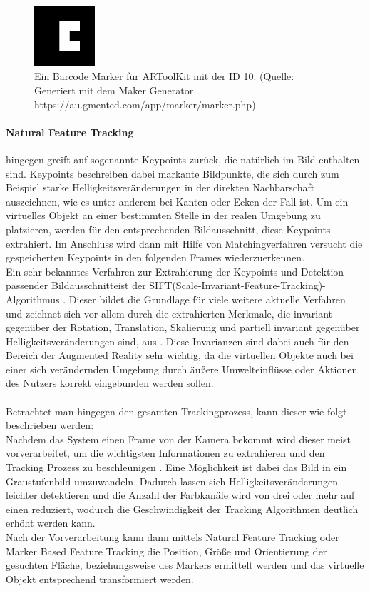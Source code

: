 \begin{figure}[h!]
\centering
\includegraphics[width=0.2\textwidth]{Abbildungen/BarcodeMarker3x3-10.png}
\caption[Barcode Marker]{Ein Barcode Marker für ARToolKit mit der ID 10. (Quelle: Generiert mit dem  Maker Generator https://au.gmented.com/app/marker/marker.php)}
\label{fig:barcode-marker}
\end{figure}


\paragraph{Natural Feature Tracking} hingegen greift auf sogenannte Keypoints zurück, die natürlich im Bild enthalten sind. Keypoints beschreiben dabei markante Bildpunkte, die sich durch zum Beispiel starke Helligkeitsveränderungen in der direkten Nachbarschaft auszeichnen, wie es unter anderem bei Kanten oder Ecken der Fall ist. Um ein virtuelles Objekt an einer bestimmten Stelle in der realen Umgebung zu platzieren, werden für den entsprechenden Bildausschnitt, diese Keypoints extrahiert. Im Anschluss wird dann mit Hilfe von Matchingverfahren versucht die gespeicherten Keypoints in den folgenden Frames wiederzuerkennen. \\
Ein sehr bekanntes Verfahren zur Extrahierung der Keypoints und Detektion passender Bildausschnitteist der SIFT(Scale-Invariant-Feature-Tracking)-Algorithmus . Dieser bildet die Grundlage für viele weitere aktuelle Verfahren und zeichnet sich vor allem durch die extrahierten Merkmale, die invariant gegenüber der Rotation, Translation, Skalierung und partiell invariant gegenüber Helligkeitsveränderungen sind, aus \citep[S. 345]{nischwitz:bildverarbeitung}. Diese Invarianzen sind dabei auch für den Bereich der Augmented Reality sehr wichtig, da die virtuellen Objekte auch bei einer sich verändernden Umgebung durch äußere Umwelteinflüsse oder Aktionen des Nutzers korrekt eingebunden werden sollen.\\
\\
Betrachtet man hingegen den gesamten Trackingprozess, kann dieser wie folgt beschrieben werden:\\
Nachdem das System einen Frame von der Kamera bekommt wird dieser meist vorverarbeitet, um die wichtigsten Informationen zu extrahieren und den Tracking Prozess zu beschleunigen \citep[S. 5]{cukovic:marker-vs-natural}. Eine Möglichkeit ist dabei das Bild in ein Graustufenbild umzuwandeln. Dadurch lassen sich Helligkeitsveränderungen leichter detektieren und die Anzahl der Farbkanäle wird von drei oder mehr auf einen reduziert, wodurch die Geschwindigkeit der Tracking Algorithmen deutlich erhöht werden kann.\\
Nach der Vorverarbeitung kann dann mittels Natural Feature Tracking oder Marker Based Feature Tracking die Position, Größe und Orientierung der gesuchten Fläche, beziehungsweise des Markers ermittelt werden und das virtuelle Objekt entsprechend transformiert werden.

